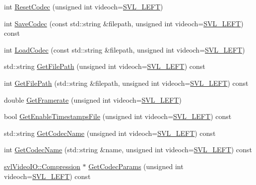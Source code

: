 \begin{DoxyCompactItemize}
\item 
int \hyperlink{classsvl_filter_video_file_writer_a3417a15e495c2e310958d890934387f7}{Reset\-Codec} (unsigned int videoch=\hyperlink{svl_definitions_8h_ab9fec7615f19c8df2919eebcab0b187f}{S\-V\-L\-\_\-\-L\-E\-F\-T})
\item 
int \hyperlink{classsvl_filter_video_file_writer_a67fa9162d568f51bfd054f73ee5992ca}{Save\-Codec} (const std\-::string \&filepath, unsigned int videoch=\hyperlink{svl_definitions_8h_ab9fec7615f19c8df2919eebcab0b187f}{S\-V\-L\-\_\-\-L\-E\-F\-T}) const 
\item 
int \hyperlink{classsvl_filter_video_file_writer_a183e557f3e6bea9277aacfc94f6a6ab1}{Load\-Codec} (const std\-::string \&filepath, unsigned int videoch=\hyperlink{svl_definitions_8h_ab9fec7615f19c8df2919eebcab0b187f}{S\-V\-L\-\_\-\-L\-E\-F\-T})
\item 
std\-::string \hyperlink{classsvl_filter_video_file_writer_aa591d6ed578c2ae26d3936fbf2b7e367}{Get\-File\-Path} (unsigned int videoch=\hyperlink{svl_definitions_8h_ab9fec7615f19c8df2919eebcab0b187f}{S\-V\-L\-\_\-\-L\-E\-F\-T}) const 
\item 
int \hyperlink{classsvl_filter_video_file_writer_a7f698e48c88029d4d5f43b4031f86c0e}{Get\-File\-Path} (std\-::string \&filepath, unsigned int videoch=\hyperlink{svl_definitions_8h_ab9fec7615f19c8df2919eebcab0b187f}{S\-V\-L\-\_\-\-L\-E\-F\-T}) const 
\item 
double \hyperlink{classsvl_filter_video_file_writer_a4787b41c72347539198e108a8b530193}{Get\-Framerate} (unsigned int videoch=\hyperlink{svl_definitions_8h_ab9fec7615f19c8df2919eebcab0b187f}{S\-V\-L\-\_\-\-L\-E\-F\-T})
\item 
bool \hyperlink{classsvl_filter_video_file_writer_a3a218b8f50e9cf3724bcf5ef69e7ba87}{Get\-Enable\-Timestamps\-File} (unsigned int videoch=\hyperlink{svl_definitions_8h_ab9fec7615f19c8df2919eebcab0b187f}{S\-V\-L\-\_\-\-L\-E\-F\-T}) const 
\item 
std\-::string \hyperlink{classsvl_filter_video_file_writer_aacd6d0d3f9e954c36c8fa602f8b2943a}{Get\-Codec\-Name} (unsigned int videoch=\hyperlink{svl_definitions_8h_ab9fec7615f19c8df2919eebcab0b187f}{S\-V\-L\-\_\-\-L\-E\-F\-T}) const 
\item 
int \hyperlink{classsvl_filter_video_file_writer_a58d9bdc74af5dfd7193d1d2274088c43}{Get\-Codec\-Name} (std\-::string \&name, unsigned int videoch=\hyperlink{svl_definitions_8h_ab9fec7615f19c8df2919eebcab0b187f}{S\-V\-L\-\_\-\-L\-E\-F\-T}) const 
\item 
\hyperlink{classsvl_video_i_o_a932d071ec9be4fefde824ab9b9125282}{svl\-Video\-I\-O\-::\-Compression} $\ast$ \hyperlink{classsvl_filter_video_file_writer_a10ea20d92306462e446bf25fdb7db416}{Get\-Codec\-Params} (unsigned int videoch=\hyperlink{svl_definitions_8h_ab9fec7615f19c8df2919eebcab0b187f}{S\-V\-L\-\_\-\-L\-E\-F\-T}) const 

\end{DoxyCompactItemize}
